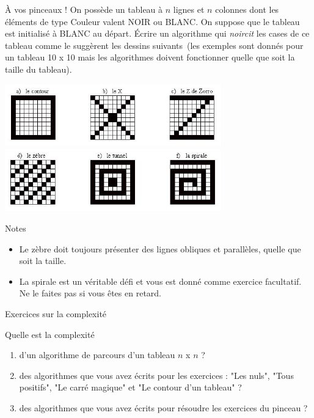 	\begin{Exercice}{À vos pinceaux !}
		On possède un tableau à $n$ lignes et $n$ colonnes dont les éléments de type
		Couleur valent NOIR ou BLANC. On suppose que le tableau est initialisé
		à BLANC au départ. Écrire un algorithme qui \emph{noircit} les cases de ce
		tableau comme le suggèrent les dessins suivants~(les exemples sont
		donnés pour un tableau 10 x 10 mais les algorithmes doivent fonctionner
		quelle que soit la taille du tableau).
		
		\begin{center}
		\includegraphics[width=0.7\textwidth]{image/tab2d-ex-oxz}
		\includegraphics[width=0.7\textwidth]{image/tab2d-ex-zts}
		\end{center}
		
		Notes
		\begin{itemize}
		\item 
			Le zèbre doit toujours présenter des lignes
			obliques et parallèles, quelle que soit la taille.
		\item
			La spirale est un véritable défi
			et vous est donné comme exercice facultatif.
			Ne le faites pas si vous êtes en retard.
		\end{itemize}
		
	\end{Exercice}
	
	\begin{Exercice}{Exercices sur la complexité}
	
		Quelle est la complexité 
		\begin{enumerate}[label=\alph*)]
		\item 
			d’un algorithme de parcours	d'un tableau $n$ x $n$ ?
		\item
			des algorithmes que vous avez écrits pour les exercices :
			"Les nuls", "Tous positifs", "Le carré magique"
			et "Le contour d'un tableau" ?
		\item 
			des algorithmes que vous avez écrits pour résoudre les
			exercices du pinceau ?
		\end{enumerate}
	\end{Exercice}